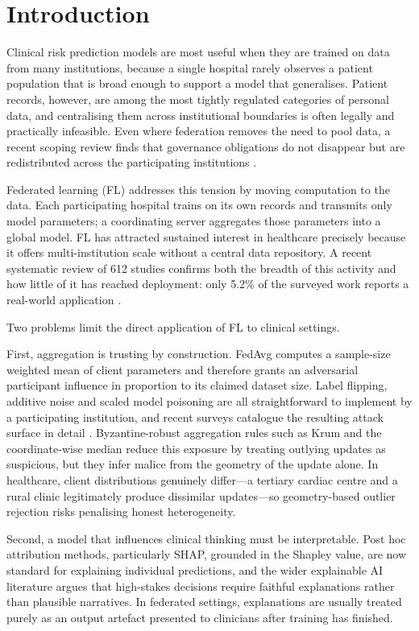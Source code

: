 \documentclass[conference]{IEEEtran}
\begin{document}
\section{Introduction}

Clinical risk prediction models are most useful when they are trained on
data from many institutions, because a single hospital rarely observes a
patient population that is broad enough to support a model that generalises.
Patient records, however, are among the most tightly regulated categories of
personal data, and centralising them across institutional boundaries is often
legally and practically infeasible. Even where federation removes the need to
pool data, a recent scoping review finds that governance obligations do not
disappear but are redistributed across the participating
institutions \cite{eden2025governance}.

Federated learning (FL) addresses this tension by moving computation to the
data. Each participating hospital trains on
its own records and transmits only model parameters; a coordinating server
aggregates those parameters into a global model. FL has attracted sustained
interest in healthcare precisely because it offers multi-institution scale
without a central data repository. A recent systematic review of 612 studies confirms both the breadth of this activity and how little of it has reached deployment: only 5.2\% of the surveyed work reports a real-world application \cite{teo2024fl}.

Two problems limit the direct application of FL to clinical settings.

First, aggregation is trusting by construction. FedAvg
computes a sample-size weighted mean of client parameters and therefore
grants an adversarial participant influence in proportion to its claimed
dataset size. Label flipping, additive noise and scaled model poisoning are
all straightforward to implement by a participating institution, and recent surveys catalogue the resulting attack surface in detail \cite{sagar2023poisoning}. Byzantine-robust aggregation
rules such as Krum and the coordinate-wise median
 reduce this exposure by treating outlying updates as
suspicious, but they infer malice from the geometry of the update alone. In
healthcare, client distributions genuinely differ---a tertiary cardiac centre
and a rural clinic legitimately produce dissimilar updates---so
geometry-based outlier rejection risks penalising honest heterogeneity.

Second, a model that influences clinical thinking must be interpretable. Post
hoc attribution methods, particularly SHAP, grounded
in the Shapley value, are now standard for explaining
individual predictions, and the wider explainable AI literature argues that
high-stakes decisions require faithful explanations rather than plausible
narratives. In federated
settings, explanations are usually treated purely as an output artefact
presented to clinicians after training has finished.
\end{document}
